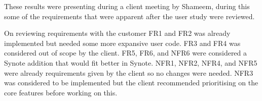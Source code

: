These results were presenting during a client meeting by Shameem, during this some of the requirements that were apparent after the user study were reviewed.

On reviewing requirements with the customer FR1 and FR2 was already implemented but needed some more expansive user code. FR3 and FR4 was considered out of scope by the client. FR5, FR6, and NFR6 were considered a Synote addition that would fit better in Synote. NFR1, NFR2, NFR4, and NFR5 were already requirements given by the client so no changes were needed. NFR3 was considered to be implemented but the client recommended prioritising on the core features before working on this. 
